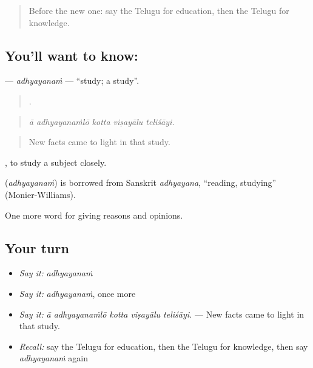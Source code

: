 \label{lesson:TE-C415-adhyayanam}



\begin{quote}
Before the new one: say the Telugu for education, then the Telugu for knowledge.
\end{quote}

\subsection*{You'll want to know: }
\textbf{} — \emph{adhyayanaṁ} — \textquotedblleft{}study; a study\textquotedblright{}.

\begin{quote}
    .
\end{quote}

\begin{quote}
\emph{ā adhyayanaṁlō kotta viṣayālu teliśāyi.}
\end{quote}

\begin{quote}
New facts came to light in that study.
\end{quote}

 , to study a subject closely.

\begin{cousinweb}
\textbf{} (\emph{adhyayanaṁ}) is borrowed from Sanskrit \emph{adhyayana}, \textquotedblleft{}reading, studying\textquotedblright{} (Monier-Williams).
\end{cousinweb}

\begin{grammarlens}[title={What you've built}]
One more word for giving reasons and opinions.
\end{grammarlens}

\subsection*{Your turn}
\begin{itemize}
\raggedright
  \item \emph{Say it:} \emph{adhyayanaṁ}
  \item \emph{Say it:} \emph{adhyayanaṁ}, once more
  \item \emph{Say it:} \emph{ā adhyayanaṁlō kotta viṣayālu teliśāyi.} — New facts came to light in that study.
  \item \emph{Recall:} say the Telugu for education, then the Telugu for knowledge, then say \emph{adhyayanaṁ} again
\end{itemize}

